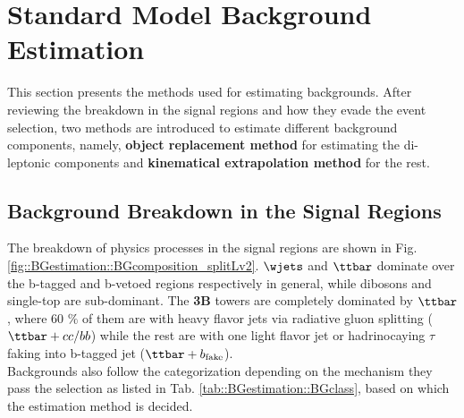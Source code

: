 \section{Standard Model Background Estimation} 
This section presents the methods used for estimating backgrounds. After reviewing the breakdown in the signal regions and how they evade the event selection, two methods are introduced to estimate different background components, namely, \textbf{object replacement method} for estimating the di-leptonic components and \textbf{kinematical extrapolation method} for the rest.


\subsection{Background Breakdown in the Signal Regions} \label{sec::BGcomposition}
The breakdown of physics processes in the signal regions are shown in Fig. \ref{fig::BGestimation::BGcomposition_splitLv2}. $\wjets$ and $\ttbar$ dominate over the b-tagged and b-vetoed regions respectively in general, while dibosons and single-top are sub-dominant. The \textbf{3B} towers are completely dominated by $\ttbar$, where 60 $\%$ of them are with heavy flavor jets via radiative gluon splitting ($\ttbar+cc/bb$) while the rest are with one light flavor jet or hadrinocaying $\tau$ faking into b-tagged jet ($\ttbar+b_{\mathrm{fake}}$).  \\

Backgrounds also follow the categorization depending on the mechanism they pass the selection as listed in Tab. \ref{tab::BGestimation::BGclass}, based on which the estimation method is decided.


